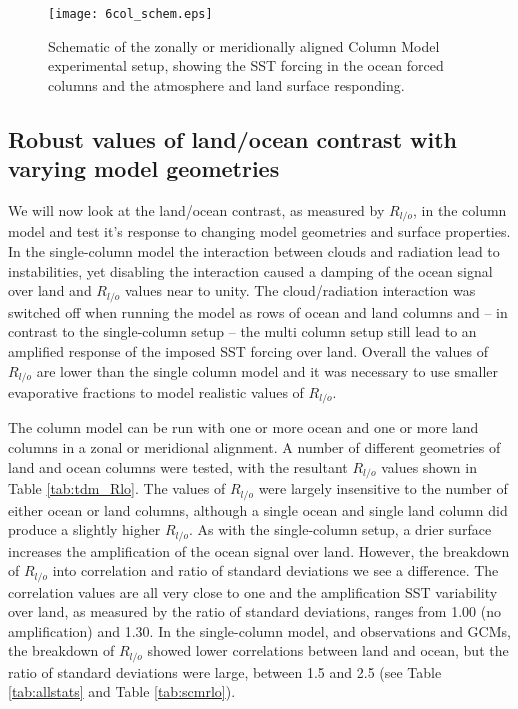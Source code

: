 \begin{figure}[ht]
\texttt{[image: 6col\_schem.eps]}
\caption{Schematic of the zonally or meridionally aligned Column Model 
experimental setup, showing the SST forcing in the ocean forced columns and the 
atmosphere and land surface responding.}
\label{fig:6cmschem}
\end{figure}

\subsection{Robust values of land/ocean contrast with varying model geometries}
\label{sec:robust_rlo}

We will now look at the land/ocean contrast, as measured by $R_{l/o}$, in the 
column model and test it's response to changing model geometries and surface 
properties. In the single-column model the interaction between clouds and 
radiation lead to instabilities, yet disabling the interaction caused a damping 
of the ocean signal over land and $R_{l/o}$ values near to unity. The 
cloud/radiation interaction was switched off when running the model as rows of 
ocean and land columns and -- in contrast to the single-column setup -- the 
multi column setup still lead to an amplified response of the imposed SST 
forcing over land.  Overall the values of $R_{l/o}$ are lower than the single 
column model and it was necessary to use smaller evaporative fractions to model 
realistic values of $R_{l/o}$.   

The column model can be run with one or more ocean and one or more land columns 
in a zonal or meridional alignment. A number of different geometries of land and 
ocean columns were tested, with the resultant $R_{l/o}$ values shown in Table 
\ref{tab:tdm_Rlo}. The values of $R_{l/o}$ were largely insensitive to the 
number of either ocean or land columns, although a single ocean and single land 
column did produce a slightly higher $R_{l/o}$. As with the single-column setup, 
a drier surface increases the amplification of the ocean signal over land.  
However, the breakdown of $R_{l/o}$ into correlation and ratio of standard 
deviations we see a difference. The correlation values are all very close to one 
and the amplification SST variability over land, as measured by the ratio of 
standard deviations, ranges from 1.00 (no amplification) and 1.30.  In the 
single-column model, and observations and GCMs, the breakdown of $R_{l/o}$ 
showed lower correlations between land and ocean, but the ratio of standard 
deviations were large, between 1.5 and 2.5 (see Table \ref{tab:allstats} and 
Table \ref{tab:scmrlo}). 


